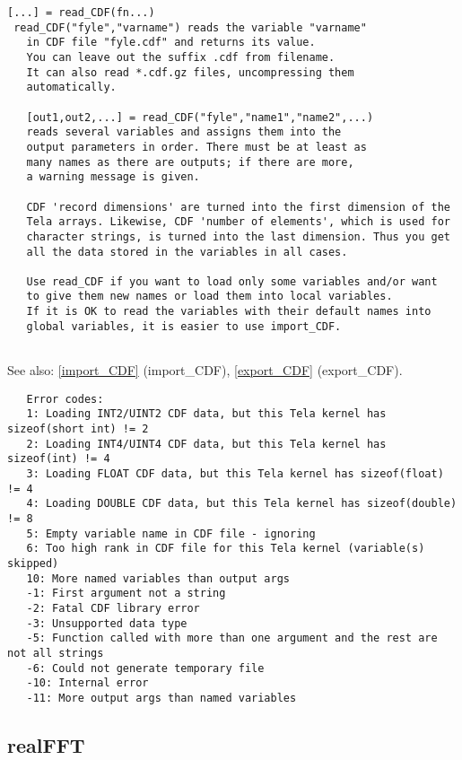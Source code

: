 \documentclass[a4paper]{article}
\begin{document}
\begin{tscreen}
\begin{verbatim}
[...] = read_CDF(fn...)
 read_CDF("fyle","varname") reads the variable "varname"
   in CDF file "fyle.cdf" and returns its value.
   You can leave out the suffix .cdf from filename.
   It can also read *.cdf.gz files, uncompressing them
   automatically.

   [out1,out2,...] = read_CDF("fyle","name1","name2",...)
   reads several variables and assigns them into the
   output parameters in order. There must be at least as
   many names as there are outputs; if there are more,
   a warning message is given.

   CDF 'record dimensions' are turned into the first dimension of the
   Tela arrays. Likewise, CDF 'number of elements', which is used for
   character strings, is turned into the last dimension. Thus you get
   all the data stored in the variables in all cases.

   Use read_CDF if you want to load only some variables and/or want
   to give them new names or load them into local variables.
   If it is OK to read the variables with their default names into
   global variables, it is easier to use import_CDF.
   
\end{verbatim}

See also: \ref{import_CDF} {(import\_CDF)}, \ref{export_CDF} {(export\_CDF)}.
\begin{verbatim}
   Error codes:
   1: Loading INT2/UINT2 CDF data, but this Tela kernel has sizeof(short int) != 2
   2: Loading INT4/UINT4 CDF data, but this Tela kernel has sizeof(int) != 4
   3: Loading FLOAT CDF data, but this Tela kernel has sizeof(float) != 4
   4: Loading DOUBLE CDF data, but this Tela kernel has sizeof(double) != 8
   5: Empty variable name in CDF file - ignoring
   6: Too high rank in CDF file for this Tela kernel (variable(s) skipped)
   10: More named variables than output args
   -1: First argument not a string
   -2: Fatal CDF library error
   -3: Unsupported data type
   -5: Function called with more than one argument and the rest are not all strings
   -6: Could not generate temporary file
   -10: Internal error
   -11: More output args than named variables
\end{verbatim}
\end{tscreen}





\subsection{realFFT\label{realFFT}}
\end{document}

